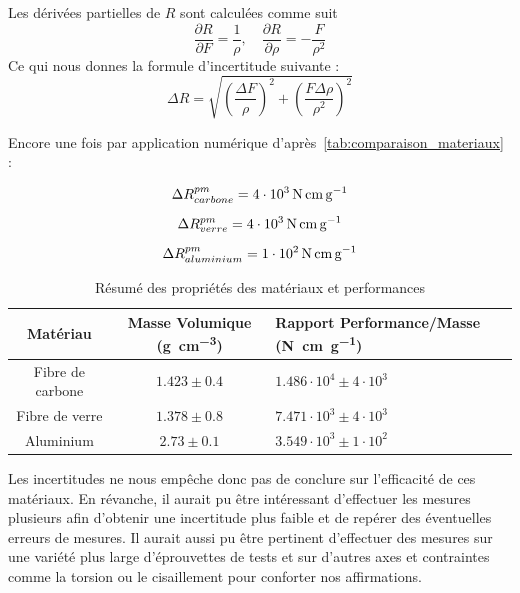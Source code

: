 Les dérivées partielles de $R$ sont calculées comme suit
\[
\frac{\partial R}{\partial F} = \frac{1}{\rho}, \quad
\frac{\partial R}{\partial \rho} = -\frac{F}{\rho^2}
\]
Ce qui nous donnes la formule d'incertitude suivante :
\[
\Delta R = \sqrt{
\left( \frac{\Delta F}{\rho} \right)^2 +
\left( \frac{F \Delta \rho}{\rho^2} \right)^2
}
\]

Encore une fois par application numérique d'après~\ref{tab:comparaison_materiaux} :

\begin{gather*}
    \Delta R^{pm}_{carbone} = \qty[parse-numbers=false]{4\cdot 10^3}{\newton\centi\meter\per\gram}\\[5pt]
    \Delta R^{pm}_{verre} = \qty[parse-numbers=false]{4\cdot 10^3}{\newton\centi\meter\per\gram}\\[5pt]
    \Delta R^{pm}_{aluminium} = \qty[parse-numbers=false]{1\cdot 10^2}{\newton\centi\meter\per\gram}
\end{gather*}

\vspace{100pt}

\begin{table}[h!]
    \centering
    \caption{Résumé des propriétés des matériaux et performances}
    \label{tab:resume_materiaux}
    \renewcommand{\arraystretch}{1.5}
    \begin{tabular}{|c|c|p{4cm}|}
        \hline
        \textbf{Matériau} & \textbf{Masse Volumique (\si{\gram\per\cubic\centi\meter})} & \textbf{Rapport Performance/Masse (\si{\newton\centi\meter\per\gram})} \\ \hline
        Fibre de carbone & $1.423 \pm 0.4$ & $1.486 \cdot 10^4 \pm 4 \cdot 10^3$ \\ \hline
        Fibre de verre & $1.378 \pm 0.8$ & $7.471 \cdot 10^3 \pm 4 \cdot 10^3$ \\ \hline
        Aluminium & $2.73 \pm 0.1$ & $3.549 \cdot 10^3 \pm 1 \cdot 10^2$ \\ \hline
    \end{tabular}
\end{table}


Les incertitudes ne nous empêche donc pas de conclure sur l'efficacité de ces matériaux.
En révanche, il aurait pu être intéressant d'effectuer les mesures plusieurs afin d'obtenir une incertitude plus faible et de repérer des éventuelles erreurs de mesures.
Il aurait aussi pu être pertinent d'effectuer des mesures sur une variété plus large d'éprouvettes de tests et sur d'autres axes et contraintes comme la torsion ou le cisaillement pour conforter nos affirmations.


